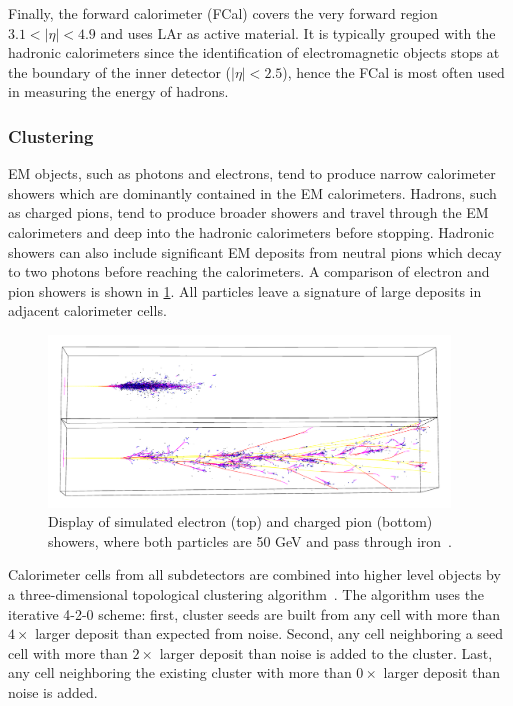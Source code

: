 Finally, the forward calorimeter (FCal) covers the very forward region $3.1 < |\eta| < 4.9$ and uses LAr as active material. It is typically grouped with the hadronic calorimeters since the identification of electromagnetic objects stops at the boundary of the inner detector ($|\eta| < 2.5$), hence the FCal is most often used in measuring the energy of hadrons.

\subsubsection{Clustering}

EM objects, such as photons and electrons, tend to produce narrow calorimeter showers which are dominantly contained in the EM calorimeters. Hadrons, such as charged pions, tend to produce broader showers and travel through the EM calorimeters and deep into the hadronic calorimeters before stopping. Hadronic showers can also include significant EM deposits from neutral pions which decay to two photons before reaching the calorimeters. A comparison of electron and pion showers is shown in \cref{fig:atlas-detector-showers}. All particles leave a signature of large deposits in adjacent calorimeter cells.

\begin{figure}[tp]
  \centering
  \includegraphics[width=0.95\textwidth]{figures/lhc-atlas/svenmenke_showers}
  \caption{Display of simulated electron (top) and charged pion (bottom) showers, where both particles are 50 GeV and pass through iron~\cite{svenmenke-showers}.}
  \label{fig:atlas-detector-showers}
\end{figure}

Calorimeter cells from all subdetectors are combined into higher level objects by a three-dimensional topological clustering algorithm~\cite{ATL-LARG-PUB-2008-002}. The algorithm uses the iterative \textsc{4-2-0} scheme: first, cluster seeds are built from any cell with more than $4\times$ larger deposit than expected from noise. Second, any cell neighboring a seed cell with more than $2\times$ larger deposit than noise is added to the cluster. Last, any cell neighboring the existing cluster with more than $0\times$ larger deposit than noise is added.

